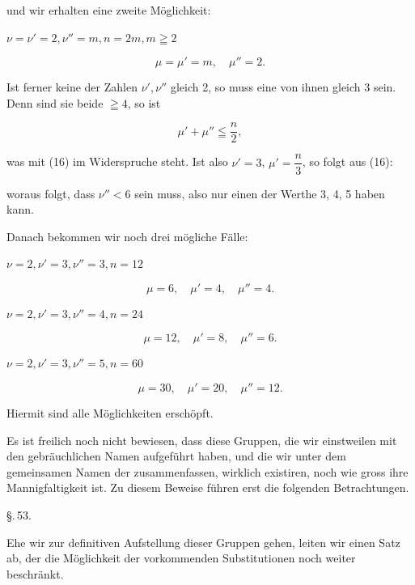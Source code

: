 und wir erhalten eine zweite Möglichkeit:

 $\nu = \nu' = 2, \nu'' = m, n = 2m, m \geqq 2$

\[ \mu = \mu' = m, \quad \mu'' = 2. \]

Ist ferner keine der Zahlen $\nu', \nu''$ gleich 2, so muss eine von ihnen gleich 3 sein. Denn sind sie beide $\geqq 4$, so ist

\[ \mu' + \mu'' \leqq \frac{n}{2}, \]

was mit (16) im Widerspruche steht. Ist also $\nu' = 3$, $\mu' = \dfrac{n}{3}$, so folgt aus (16):


woraus folgt, dass $\nu'' < 6$ sein muss, also nur einen der Werthe 3, 4, 5 haben kann.

Danach bekommen wir noch drei mögliche Fälle:

 $\nu = 2, \nu' = 3, \nu'' = 3, n = 12$

\[ \mu = 6, \quad \mu' = 4, \quad \mu'' = 4. \]

 $\nu = 2, \nu' = 3, \nu'' = 4, n = 24$

\[ \mu = 12, \quad \mu' = 8, \quad \mu'' = 6. \]

 $\nu = 2, \nu' = 3, \nu'' = 5, n = 60$

\[ \mu = 30, \quad \mu' = 20, \quad \mu'' = 12. \]

Hiermit sind alle Möglichkeiten erschöpft.

Es ist freilich noch nicht bewiesen, dass diese Gruppen, die wir einstweilen mit den gebräuchlichen Namen aufgeführt haben, und die wir unter dem gemeinsamen Namen der  zusammenfassen, wirklich existiren, noch wie gross ihre Mannigfaltigkeit ist. Zu diesem Beweise führen erst die folgenden Betrachtungen.

\begin{center}
\S.\,53.

\end{center}

Ehe wir zur definitiven Aufstellung dieser Gruppen gehen, leiten wir einen Satz ab, der die Möglichkeit der vorkommenden Substitutionen noch weiter beschränkt.

